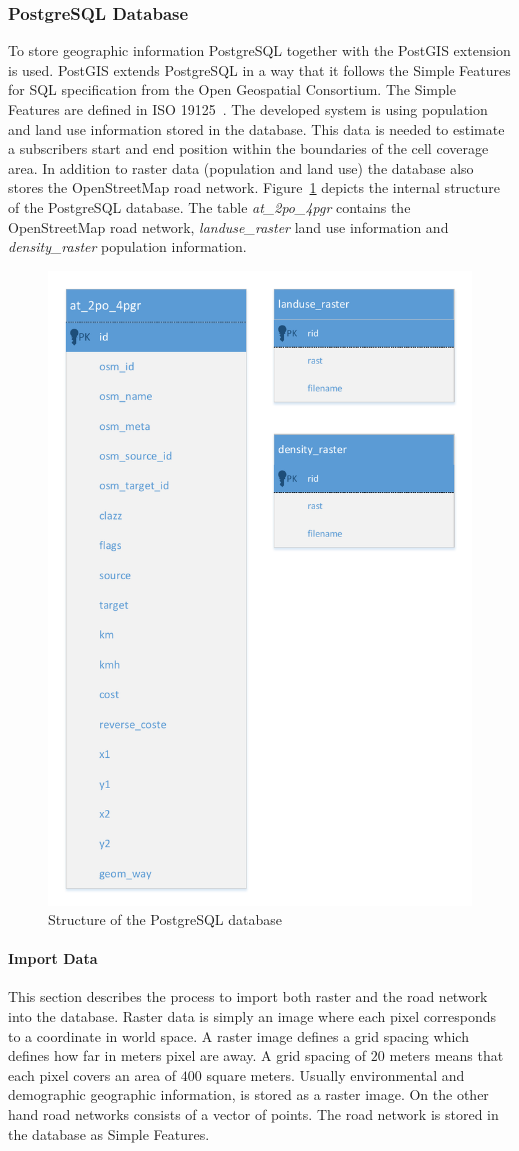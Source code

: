 \documentclass[master,english]{hgbthesis}
\begin{document}
\subsubsection{PostgreSQL Database}
To store geographic information PostgreSQL together with the PostGIS extension is used. PostGIS extends PostgreSQL in a way that it follows the Simple Features for SQL specification from the Open Geospatial Consortium. The Simple Features are defined in ISO 19125~\cite{ISO19125,ISO191252}. The developed system is using population and land use information stored in the database. This data is needed to estimate a subscribers start and end position within the boundaries of the cell coverage area. In addition to raster data (population and land use) the database also stores the OpenStreetMap road network. Figure~\ref{fig:pg_structure} depicts the internal structure of the PostgreSQL database. The table \emph{at_2po_4pgr} contains the OpenStreetMap road network, \emph{landuse_raster} land use information and \emph{density_raster} population information.
\begin{figure}
\centering
\includegraphics[width=0.7\linewidth]{./images/pg_structure}
\caption{Structure of the PostgreSQL database}
\label{fig:pg_structure}
\end{figure}
\paragraph{Import Data}
This section describes the process to import both raster and the road network into the database. Raster data is simply an image where each pixel corresponds to a coordinate in world space. A raster image defines a grid spacing which defines how far in meters pixel are away. A grid spacing of $20$ meters means that each pixel covers an area of $400$ square meters. Usually environmental and demographic geographic information, is stored as a raster image. On the other hand road networks consists of a vector of points. The road network is stored in the database as Simple Features.
\end{document}
